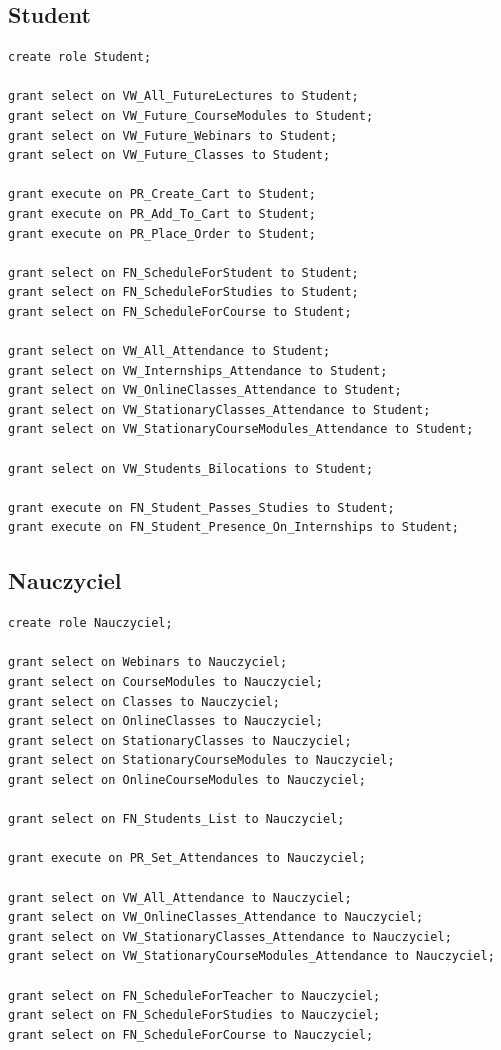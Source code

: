 \documentclass[11pt,a4paper]{article}
\begin{document}
\subsection{Student}
\begin{Verbatim}
create role Student;

grant select on VW_All_FutureLectures to Student;
grant select on VW_Future_CourseModules to Student;
grant select on VW_Future_Webinars to Student;
grant select on VW_Future_Classes to Student;

grant execute on PR_Create_Cart to Student;
grant execute on PR_Add_To_Cart to Student;
grant execute on PR_Place_Order to Student;

grant select on FN_ScheduleForStudent to Student;
grant select on FN_ScheduleForStudies to Student;
grant select on FN_ScheduleForCourse to Student;

grant select on VW_All_Attendance to Student;
grant select on VW_Internships_Attendance to Student;
grant select on VW_OnlineClasses_Attendance to Student;
grant select on VW_StationaryClasses_Attendance to Student;
grant select on VW_StationaryCourseModules_Attendance to Student;

grant select on VW_Students_Bilocations to Student;

grant execute on FN_Student_Passes_Studies to Student;
grant execute on FN_Student_Presence_On_Internships to Student;
\end{Verbatim}
\subsection{Nauczyciel}
\begin{Verbatim}
create role Nauczyciel;

grant select on Webinars to Nauczyciel;
grant select on CourseModules to Nauczyciel;
grant select on Classes to Nauczyciel;
grant select on OnlineClasses to Nauczyciel;
grant select on StationaryClasses to Nauczyciel;
grant select on StationaryCourseModules to Nauczyciel;
grant select on OnlineCourseModules to Nauczyciel;

grant select on FN_Students_List to Nauczyciel;

grant execute on PR_Set_Attendances to Nauczyciel;

grant select on VW_All_Attendance to Nauczyciel;
grant select on VW_OnlineClasses_Attendance to Nauczyciel;
grant select on VW_StationaryClasses_Attendance to Nauczyciel;
grant select on VW_StationaryCourseModules_Attendance to Nauczyciel;

grant select on FN_ScheduleForTeacher to Nauczyciel;
grant select on FN_ScheduleForStudies to Nauczyciel;
grant select on FN_ScheduleForCourse to Nauczyciel;
\end{Verbatim}
\end{document}
